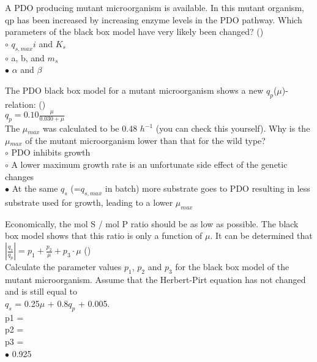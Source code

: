 \documentclass[]{beamer}
\begin{document}
\begin{frame}[shrink] {} 
\color{blue}
A PDO producing mutant microorganism is available. In this mutant organism, qp has been increased by increasing enzyme levels in the PDO pathway. Which parameters of the black box model have very likely been changed? ({\color{green}{Q4a}})\\
\color{black}
\setlength{\parindent}{-0.4cm}
{\color{red}$\circ$}  $q_{s,max}i$ and $K_s$ \\
{\color{red}$\circ$}  a, b, and $m_s$ \\
{\color{red}$\bullet$}  $\alpha$ and $\beta$ \\
\end{frame}


\begin{frame}[shrink] {} 
\color{blue}
The PDO black box model for a mutant microorganism shows a new $q_{p}$($\mu$)-relation: ({\color{green}{Q4b}})\\[0.3em]
{\color{gray} $q_p = 0.10 \frac{\mu}{0.030+\mu}$}\\[0.3em]
The $\mu$$_{max}$ was calculated to be 0.48 $h^{-1}$ (you can check this yourself). 
Why is the $\mu$$_{max}$ of the mutant microorganism lower than that for the wild type?\\
\color{black}
\setlength{\parindent}{-0.4cm}
{\color{red}$\circ$}  PDO inhibits growth \\
{\color{red}$\circ$}  A lower maximum growth rate is an unfortunate side effect of the genetic changes \\
{\color{red}$\bullet$}  At the same $q_{s}$ (=$q_{s,max}$ in batch) more substrate goes to PDO resulting in less substrate used for growth, leading to a lower $\mu_{max}$ \\
\end{frame}


\begin{frame}[shrink] {} 
\color{blue}
Economically, the mol S / mol P ratio should be as low as possible. The
black box model shows that this ratio is only a function of $\mu$. It can be
determined that
\color{gray}
$|\frac{q_s}{q_p}| = p_1+\frac{p_2}{\mu}+p_3 \cdot{} \mu$ ({\color{green}{Q4c}})\\[0.3em]
\color{blue}
Calculate the parameter values $p_{1}$, $p_{2}$ and $p_{3}$ for the black box model of the mutant microorganism. Assume that the Herbert-Pirt equation has not changed and is still equal to \\
\color{gray}
$q_{s}$ = 0.25$\mu$ + 0.8$q_{p}$ + 0.005. \\
\color{black}
\setlength{\parindent}{-0.4cm}
p1 = \underline{\quad }\\
p2 = \underline{\quad }\\
p3 = \underline{\quad }\\[0.5em]
{\color{red}$\bullet$} 0.925  \\
\end{frame}
\end{document}
